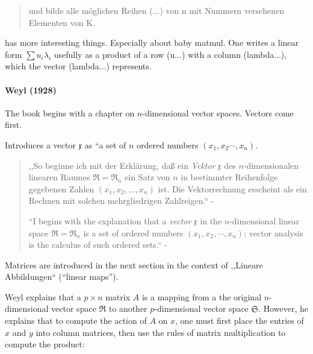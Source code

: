 \begin{quote}
und bilde alle möglichen Reihen (...) von n
mit Nummern versehenen Elementen von K.


\end{quote}

\cite[\S 104, pp. 110. ff.]{vdWaerden1931} has more interesting things.
Especially about baby matmul.
One writes a linear form $\sum u_i \lambda_i$ usefully as a product of a row (u...) with a column (lambda...), which the vector (lambda...) represents.



\paragraph{Weyl (1928)~\cite{Weyl1928,Weyl1931}}

The book begins with a chapter on $n$-dimensional vector spaces.
Vectors come first.

Introduces a vector $\mathfrak x$ as ``a set of $n$ ordered numbers $(x_1, x_2 \cdots, x_n)$.

\begin{quote}
,,So beginne ich mit der Erklärung, daß ein \textit{Vektor} $\mathfrak x$ des $n$-dimensionalen linearen Raumes
$\mathfrak R = \mathfrak R_n$
ein Satz von $n$ in bestimmter Reihenfolge gegebenen Zahlen $(x_1, x_2, \dots, x_n)$
ist. Die Vektorrechnung erscheint als ein Rechnen mit solchen mehrgliedrigen
Zahlreigen.`` - \cite[p. 4]{Weyl1928}

``I begins with the explanation that a \textit{vector} $\mathfrak x$ in the $n$-dimensional
linear space $\mathfrak R = \mathfrak R_n$ is a set of ordered numbers $(x_1, x_2, \cdots, x_n)$;
vector analysis is the calculus of such ordered sets.`` - \cite[p. 1]{Weyl1931}
\end{quote}

Matrices are introduced in the next section in the context of ,,Lineare Abbildungen``
(``linear maps'').

Weyl explains that a $p \times n$ matrix $A$ is a mapping from a the original
$n$-dimensional vector space $\mathfrak R$ to another $p$-dimensional vector space
$\mathfrak S$. However, he explains that to compute the action of $A$ on $x$, one
must first place the entries of $x$ and $y$ into column matrices, then use the
rules of matrix multiplication to compute the product:

